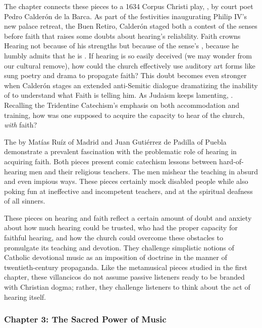 \documentclass{vcbook-proposal}
\begin{document}
The chapter connects these pieces to a 1634 Corpus Christi play, , by court poet Pedro Calderón de la Barca.%
  \autocite{Calderon:Retiro}
As part of the festivities inaugurating Philip IV's new palace retreat, the Buen Retiro, Calderón staged both a contest of the senses before faith that raises some doubts about hearing's reliability.
Faith crowns Hearing not because of his strengths but because of the sense's , because he humbly admits that he is .
If hearing is so easily deceived (we may wonder from our cultural remove), how could the church effectively use auditory art forms like sung poetry and drama to propagate faith?
This doubt becomes even stronger when Calderón stages an extended anti-Semitic dialogue dramatizing the inability of  to understand what Faith is telling him.
As Judaism keeps lamenting, .
Recalling the Tridentine Catechism's emphasis on both accommodation and training, how was one supposed to acquire the capacity to hear  of the church, \emph{with} faith?

The  by Matías Ruíz of Madrid and Juan Gutiérrez de Padilla of Puebla demonstrate a prevalent fascination with the problematic role of hearing in acquiring faith.
Both pieces present comic catechism lessons between hard-of-hearing men and their religious teachers.
The  men mishear the teaching in absurd and even impious ways.
These pieces certainly mock disabled people while also poking fun at ineffective and incompetent teachers, and at the spiritual deafness of all sinners.

These pieces on hearing and faith reflect a certain amount of doubt and anxiety about how much hearing could be trusted, who had the proper capacity for faithful hearing, and how the church could overcome these obstacles to promulgate its teaching and devotion.
They challenge simplistic notions of Catholic devotional music as an imposition of doctrine in the manner of twentieth-century propaganda. 
Like the metamusical pieces studied in the first chapter, these villancicos do not assume passive listeners ready to be branded with Christian dogma; rather, they challenge listeners to think about the act of hearing itself.


\subsubsection{Chapter 3: The Sacred Power of Music}
\end{document}
